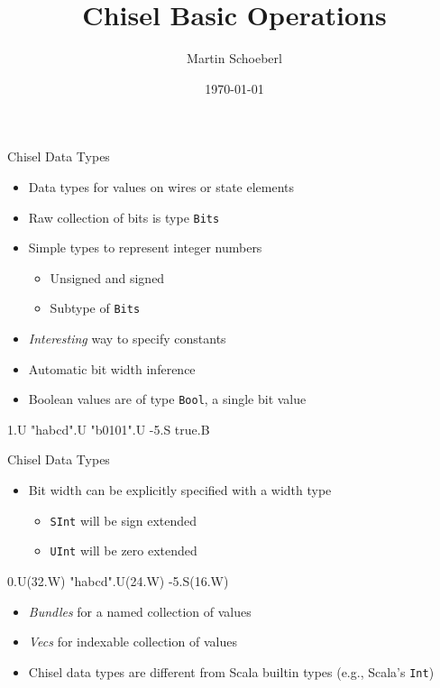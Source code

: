 \documentclass[xcolor=pdflatex,dvipsnames,table]{beamer}
\title{Chisel Basic Operations}
\author{Martin Schoeberl}
\date{\today}
\institute{Technical University of Denmark}
\newcommand{\code}[1]{{\texttt{#1}}}
\begin{document}
\begin{frame}
\titlepage
\end{frame}

\begin{frame}[fragile]{Chisel Data Types}
\begin{itemize}
\item Data types for values on wires or state elements
\item Raw collection of bits is type \code{Bits}
\item Simple types to represent integer numbers
\begin{itemize}
\item Unsigned and signed
\item Subtype of \code{Bits}
\end{itemize}
\item \emph{Interesting} way to specify constants
\item Automatic bit width inference
\item Boolean values are of type \code{Bool}, a single bit value
\end{itemize}
\begin{chisel}
1.U
"habcd".U
"b0101".U
-5.S
true.B
\end{chisel}
\end{frame}

\begin{frame}[fragile]{Chisel Data Types}
\begin{itemize}
\item Bit width can be explicitly specified with a width type
\begin{itemize}
\item \code{SInt} will be sign extended
\item \code{UInt} will be zero extended
\end{itemize}
\end{itemize}
\begin{chisel}
0.U(32.W)
"habcd".U(24.W)
-5.S(16.W)
\end{chisel}
\begin{itemize}
\item \emph{Bundles} for a named collection of values
\item \emph{Vecs} for indexable collection of values
\item Chisel data types are different from Scala builtin types (e.g., Scala's \code{Int})
\end{itemize}
\end{frame}
\end{document}
